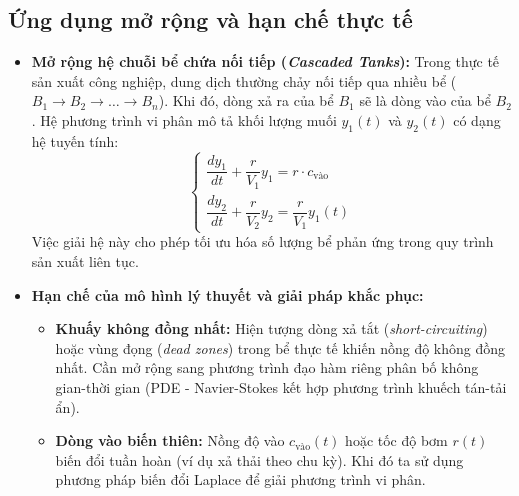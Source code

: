 \documentclass[14pt]{extarticle}
\begin{document}
\subsection{Ứng dụng mở rộng và hạn chế thực tế}

\begin{itemize}
    \item \textbf{Mở rộng hệ chuỗi bể chứa nối tiếp (\textit{Cascaded Tanks}):}
    Trong thực tế sản xuất công nghiệp, dung dịch thường chảy nối tiếp qua nhiều bể ($B_1 \to B_2 \to \dots \to B_n$). Khi đó, dòng xả ra của bể $B_1$ sẽ là dòng vào của bể $B_2$. Hệ phương trình vi phân mô tả khối lượng muối $y_1(t)$ và $y_2(t)$ có dạng hệ tuyến tính:
    $$\begin{cases}
    \dfrac{dy_1}{dt} + \dfrac{r}{V_1}y_1 = r \cdot c_{\text{vào}} \\[8pt]
    \dfrac{dy_2}{dt} + \dfrac{r}{V_2}y_2 = \dfrac{r}{V_1}y_1(t)
    \end{cases}$$
    Việc giải hệ này cho phép tối ưu hóa số lượng bể phản ứng trong quy trình sản xuất liên tục.

    \item \textbf{Hạn chế của mô hình lý thuyết và giải pháp khắc phục:}
    \begin{itemize}
        \item \textbf{Khuấy không đồng nhất:} Hiện tượng dòng xả tắt (\textit{short-circuiting}) hoặc vùng đọng (\textit{dead zones}) trong bể thực tế khiến nồng độ không đồng nhất. Cần mở rộng sang phương trình đạo hàm riêng phân bố không gian-thời gian (PDE - Navier-Stokes kết hợp phương trình khuếch tán-tải ẩn).
        \item \textbf{Dòng vào biến thiên:} Nồng độ vào $c_{\text{vào}}(t)$ hoặc tốc độ bơm $r(t)$ biến đổi tuần hoàn (ví dụ xả thải theo chu kỳ). Khi đó ta sử dụng phương pháp biến đổi Laplace để giải phương trình vi phân.
    \end{itemize}
\end{itemize}
\end{document}
